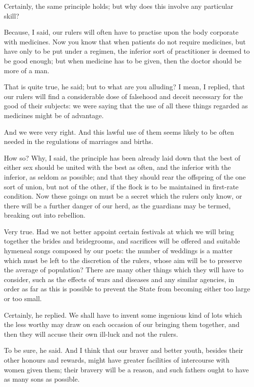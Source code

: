 Certainly, the same principle holds; but why does this involve any particular skill?

Because, I said, our rulers will often have to practise upon the body corporate with medicines. Now you know that when patients do not require medicines, but have only to be put under a regimen, the inferior sort of practitioner is deemed to be good enough; but when medicine has to be given, then the doctor should be more of a man.

That is quite true, he said; but to what are you alluding?
I mean, I replied, that our rulers will find a considerable dose of falsehood and deceit necessary for the good of their subjects: we were saying that the use of all these things regarded as medicines might be of advantage.

And we were very right.
And this lawful use of them seems likely to be often needed in the regulations of marriages and births.

How so?
Why, I said, the principle has been already laid down that the best of either sex should be united with the best as often, and the inferior with the inferior, as seldom as possible; and that they should rear the offspring of the one sort of union, but not of the other, if the flock is to be maintained in first-rate condition. Now these goings on must be a secret which the rulers only know, or there will be a further danger of our herd, as the guardians may be termed, breaking out into rebellion.

Very true.
Had we not better appoint certain festivals at which we will bring together the brides and bridegrooms, and sacrifices will be offered and suitable hymeneal songs composed by our poets: the number of weddings is a matter which must be left to the discretion of the rulers, whose aim will be to preserve the average of population? There are many other things which they will have to consider, such as the effects of wars and diseases and any similar agencies, in order as far as this is possible to prevent the State from becoming either too large or too small.

Certainly, he replied.
We shall have to invent some ingenious kind of lots which the less worthy may draw on each occasion of our bringing them together, and then they will accuse their own ill-luck and not the rulers.

To be sure, he said.
And I think that our braver and better youth, besides their other honours and rewards, might have greater facilities of intercourse with women given them; their bravery will be a reason, and such fathers ought to have as many sons as possible.

